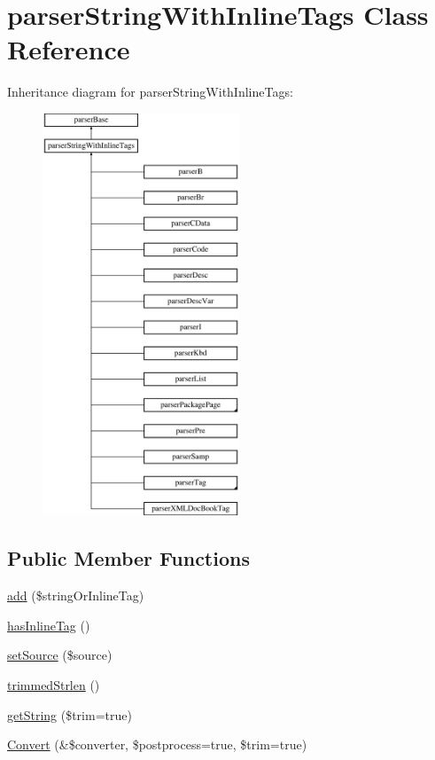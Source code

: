 \hypertarget{classparser_string_with_inline_tags}{\section{parser\-String\-With\-Inline\-Tags \-Class \-Reference}
\label{classparser_string_with_inline_tags}
}
\-Inheritance diagram for parser\-String\-With\-Inline\-Tags\-:\begin{figure}[H]
\begin{center}
\leavevmode
\includegraphics[height=12.000000cm]{classparser_string_with_inline_tags}
\end{center}
\end{figure}
\subsection*{\-Public \-Member \-Functions}
\begin{DoxyCompactItemize}
\item 
\hyperlink{classparser_string_with_inline_tags_afe2f1d256f75c2888745dba33b07042b}{add} (\$string\-Or\-Inline\-Tag)
\item 
\hyperlink{classparser_string_with_inline_tags_af86f537e6ca8332122850cfbef60933f}{has\-Inline\-Tag} ()
\item 
\hyperlink{classparser_string_with_inline_tags_a55a8779d4a8f6d2bbec5e6fedf28ef7c}{set\-Source} (\$source)
\item 
\hyperlink{classparser_string_with_inline_tags_a2635bc672afab8cea9c47ee2ad79ac66}{trimmed\-Strlen} ()
\item 
\hyperlink{classparser_string_with_inline_tags_aaf35560fbbf47c02d72f3aa994dddb19}{get\-String} (\$trim=true)
\item 
\hyperlink{classparser_string_with_inline_tags_a0cd1d8e1e41d6daa6bcdfdb8ed60b35b}{\-Convert} (\&\$converter, \$postprocess=true, \$trim=true)
\end{DoxyCompactItemize}
